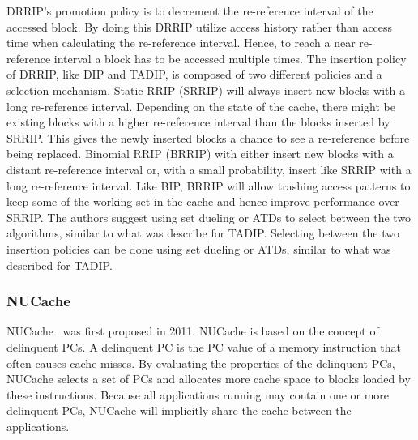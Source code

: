 DRRIP's promotion policy is to decrement the re-reference interval of the accessed block.
By doing this DRRIP utilize access history rather than access time when calculating the re-reference interval.
Hence, to reach a near re-reference interval a block has to be accessed multiple times.
The insertion policy of DRRIP, like DIP and TADIP, is composed of two different policies and a selection mechanism.
Static RRIP (SRRIP) will always insert new blocks with a long re-reference interval. 
Depending on the state of the cache, there might be existing blocks with a higher re-reference interval than the blocks inserted by SRRIP.
This gives the newly inserted blocks a chance to see a re-reference before being replaced.
Binomial RRIP (BRRIP) with either insert new blocks with a distant re-reference interval or, with a small probability, insert like SRRIP with a long re-reference interval.
Like BIP, BRRIP will allow trashing access patterns to keep some of the working set in the cache and hence improve performance over SRRIP.
The authors suggest using set dueling or ATDs to select between the two algorithms, similar to what was describe for TADIP.
Selecting between the two insertion policies can be done using set dueling or ATDs, similar to what was described for TADIP.

\subsubsection{NUCache}

NUCache~\cite{manikantan11} was first proposed in 2011.
NUCache is based on the concept of delinquent PCs.
A delinquent PC is the PC value of a memory instruction that often causes cache misses.
By evaluating the properties of the delinquent PCs, NUCache selects a set of PCs and allocates more cache space to blocks loaded by these instructions.
Because all applications running may contain one or more delinquent PCs, NUCache will implicitly share the cache between the applications.

